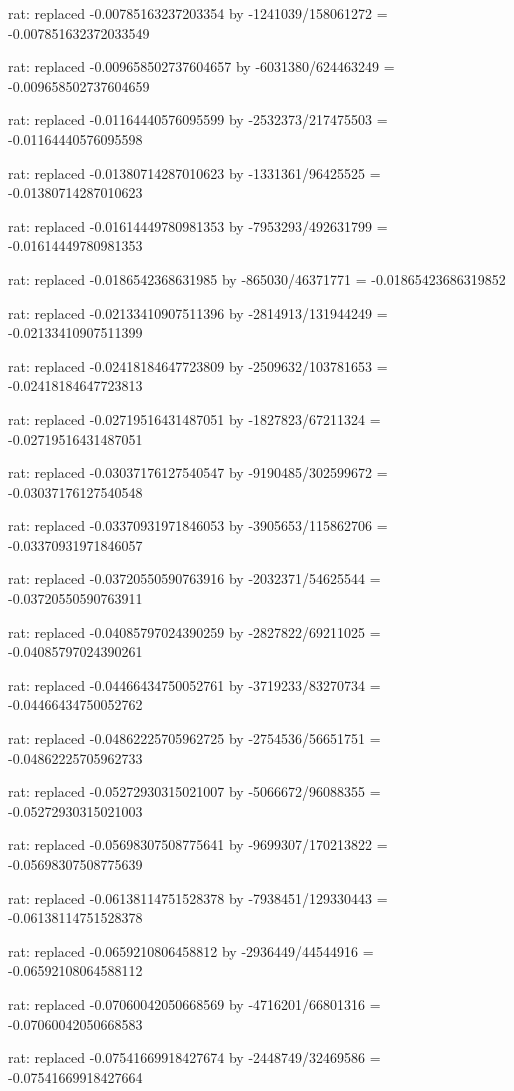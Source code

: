 \documentclass[a4paper,10pt]{article}
\begin{document}
\begin{eulernotebook}
\begin{eulercomment}
\begin{eulercomment}
\begin{eulercomment}
\begin{eulercomment}
\begin{eulercomment}
\begin{eulercomment}
\begin{eulercomment}
\begin{eulercomment}
\begin{eulercomment}
\begin{eulercomment}
\begin{eulercomment}
\begin{eulercomment}
\begin{eulercomment}
\begin{eulercomment}
\begin{eulercomment}
\begin{eulercomment}
\begin{euleroutput}
  rat: replaced -0.00785163237203354 by -1241039/158061272 = -0.007851632372033549
  
  rat: replaced -0.009658502737604657 by -6031380/624463249 = -0.009658502737604659
  
  rat: replaced -0.01164440576095599 by -2532373/217475503 = -0.01164440576095598
  
  rat: replaced -0.01380714287010623 by -1331361/96425525 = -0.01380714287010623
  
  rat: replaced -0.01614449780981353 by -7953293/492631799 = -0.01614449780981353
  
  rat: replaced -0.0186542368631985 by -865030/46371771 = -0.01865423686319852
  
  rat: replaced -0.02133410907511396 by -2814913/131944249 = -0.02133410907511399
  
  rat: replaced -0.02418184647723809 by -2509632/103781653 = -0.02418184647723813
  
  rat: replaced -0.02719516431487051 by -1827823/67211324 = -0.02719516431487051
  
  rat: replaced -0.03037176127540547 by -9190485/302599672 = -0.03037176127540548
  
  rat: replaced -0.03370931971846053 by -3905653/115862706 = -0.03370931971846057
  
  rat: replaced -0.03720550590763916 by -2032371/54625544 = -0.03720550590763911
  
  rat: replaced -0.04085797024390259 by -2827822/69211025 = -0.04085797024390261
  
  rat: replaced -0.04466434750052761 by -3719233/83270734 = -0.04466434750052762
  
  rat: replaced -0.04862225705962725 by -2754536/56651751 = -0.04862225705962733
  
  rat: replaced -0.05272930315021007 by -5066672/96088355 = -0.05272930315021003
  
  rat: replaced -0.05698307508775641 by -9699307/170213822 = -0.05698307508775639
  
  rat: replaced -0.06138114751528378 by -7938451/129330443 = -0.06138114751528378
  
  rat: replaced -0.0659210806458812 by -2936449/44544916 = -0.06592108064588112
  
  rat: replaced -0.07060042050668569 by -4716201/66801316 = -0.07060042050668583
  
  rat: replaced -0.07541669918427674 by -2448749/32469586 = -0.07541669918427664
  

\end{euleroutput}
\end{eulercomment}
\end{eulercomment}
\end{eulercomment}
\end{eulercomment}
\end{eulercomment}
\end{eulercomment}
\end{eulercomment}
\end{eulercomment}
\end{eulercomment}
\end{eulercomment}
\end{eulercomment}
\end{eulercomment}
\end{eulercomment}
\end{eulercomment}
\end{eulercomment}
\end{eulercomment}
\end{eulernotebook}
\end{document}
